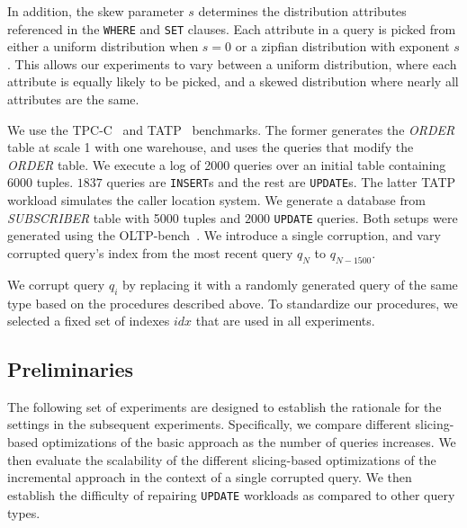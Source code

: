 In addition, the skew parameter $s$ determines the distribution attributes referenced in the \texttt{WHERE} and \texttt{SET} clauses.  
Each attribute in a query is picked from either a uniform distribution when $s=0$ or a zipfian distribution with exponent $s$.
This allows our experiments to vary between a uniform distribution, where each attribute is
equally likely to be picked, and a skewed distribution where nearly all attributes are the same. 

 We use the TPC-C~\cite{tpcc} and TATP~\cite{tatp} benchmarks.
The former generates the {\it ORDER} table at scale 1 with one warehouse, and uses the queries that modify the {\it ORDER} table. 
We execute a log of 2000 queries over an initial table containing 6000 tuples.  
$1837$ queries are \texttt{INSERT}s and the rest are \texttt{UPDATE}s. 
The latter TATP workload simulates the caller location system. 
We generate a database from {\it SUBSCRIBER} table with 5000 tuples and $2000$ \texttt{UPDATE} queries.
Both setups were generated using the OLTP-bench~\cite{difallah2013oltp}. 
We introduce a single corruption, and vary corrupted query's index from the most recent query $q_N$ to $q_{N-1500}$.



 We corrupt query $q_i$ by replacing it with a randomly
generated query of the same type based on the procedures described above.
To standardize our procedures, we selected a fixed set of indexes $idx$
that are used in all experiments.  







\subsection{Preliminaries}
The following set of experiments are designed to establish the rationale for 
the settings in the subsequent experiments.  
Specifically, we compare different slicing-based optimizations of the basic approach
as the number of queries increases.  
We then evaluate the scalability of the different slicing-based optimizations of the 
incremental approach in the context of a single
corrupted query. We then establish the difficulty of repairing \texttt{UPDATE} 
workloads as compared to other query types. 

